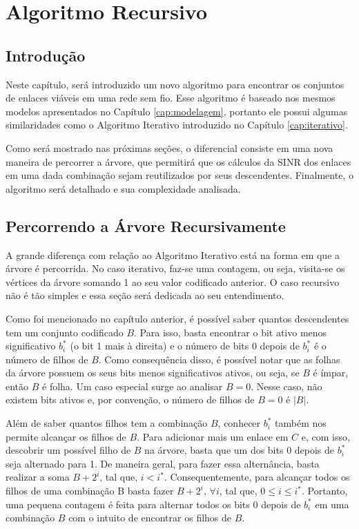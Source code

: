 \chapter{Algoritmo Recursivo}
\label{cap:recursivo}

\section{Introdução}

Neste capítulo, será introduzido um novo algoritmo para encontrar os conjuntos de enlaces viáveis em uma rede sem fio. Esse algoritmo é baseado nos mesmos modelos apresentados no Capítulo \ref{cap:modelagem}, portanto ele possui algumas similaridades como o Algoritmo Iterativo introduzido no Capítulo \ref{cap:iterativo}. 

Como será mostrado nas próximas seções, o diferencial consiste em uma nova maneira de percorrer a árvore, que permitirá que os cálculos da SINR dos enlaces em uma dada combinação sejam reutilizados por seus descendentes. Finalmente, o algoritmo será detalhado e sua complexidade analisada.

\section{Percorrendo a Árvore Recursivamente}

A grande diferença com relação ao Algoritmo Iterativo está na forma em que a árvore é percorrida. No caso iterativo, faz-se uma contagem, ou seja, visita-se os vértices da árvore somando 1 ao seu valor codificado anterior. O caso recursivo não é tão simples e essa seção será dedicada ao seu entendimento.

Como foi mencionado no capítulo anterior, é possível saber quantos descendentes tem um conjunto codificado $B$. Para isso, basta encontrar o bit ativo menos significativo $b_i^*$ (o bit 1 mais à direita) e o número de bits 0 depois de $b_i^*$ é o número de filhos de $B$. Como consequência disso, é possível notar que as folhas da árvore possuem os seus bits menos significativos ativos, ou seja, se $B$ é ímpar, então $B$ é folha. Um caso especial surge ao analisar $B=0$. Nesse caso, não existem bits ativos e, por convenção, o número de filhos de $B=0$ é $|B|$.

Além de saber quantos filhos tem a combinação $B$, conhecer $b_i^*$ também nos permite alcançar os filhos de $B$. Para adicionar mais um enlace em $C$ e, com isso, descobrir um possível filho de $B$ na árvore, basta que um dos bits 0 depois de $b_i^*$ seja alternado para 1. De maneira geral, para fazer essa alternância, basta realizar a soma $B + 2^i$, tal que, $i < i^*$. Consequentemente, para alcançar todos os filhos de uma combinação B basta fazer $B + 2^i$, $\forall i$, tal que, $0\leq i\leq i^*$. Portanto, uma pequena contagem é feita para alternar todos os bits 0 depois de $b_i^*$ em uma combinação $B$ com o intuito de encontrar os filhos de $B$.


